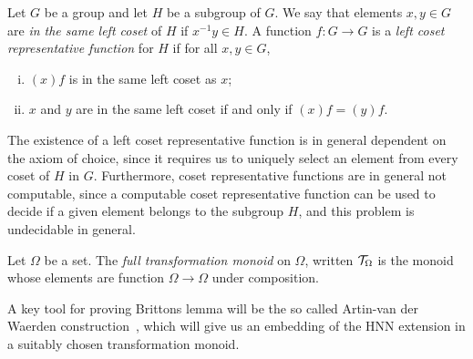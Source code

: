 \begin{definition}%
  \label{def:left_coset}
  \rocqok{}
Let $G$ be a group and let $H$ be a subgroup of $G$.
We say that elements $x, y\in G$ are
\emph{in the same left coset} of $H$ if $x^{-1}y\in H$.
A function $f: G \rightarrow G$ is a \emph{left coset representative function} for $H$
if for all $x, y\in G$,
\begin{enumerate}[(i)]
  \item $(x)f$ is in the same left coset as $x$;
  \item $x$ and $y$ are in the same left coset if and only if $(x)f = (y)f$.
\end{enumerate}
\end{definition}

The existence of a left coset representative function is in general dependent on the axiom of
choice, since it requires us to uniquely select an element from every coset of $H$ in $G$.
Furthermore, coset representative functions are in general not computable, since a computable
coset representative function can be used to decide if a given element belongs to the subgroup
$H$, and this problem is undecidable in general.

\begin{definition}%
  \label{def:full_transformation_monoid}
Let $\Omega$ be a set. The \emph{full transformation monoid} on $\Omega$, written $\mathcal{T}_\Omega$
is the monoid whose elements are function $\Omega\rightarrow \Omega$ under composition.
\end{definition}
A key tool for proving Brittons lemma will be the so called Artin-van der Waerden
construction~\cite[Proof of theorem 2.1]{Lyndon2001aa}, which will give us an embedding of
the HNN extension in a suitably chosen transformation monoid.

